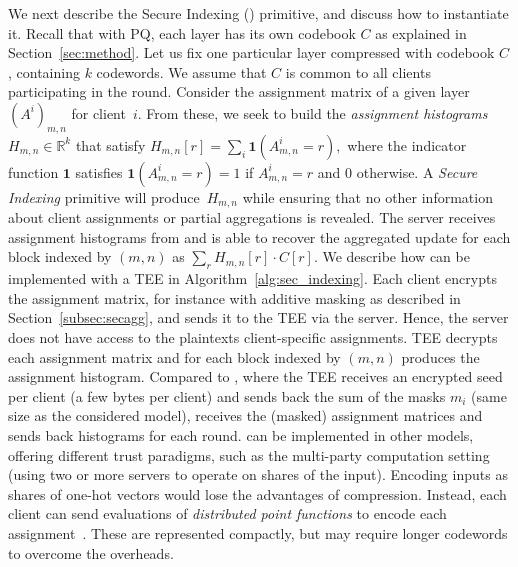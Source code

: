 We next describe the Secure Indexing (\SecInd) primitive, and discuss how to instantiate it. 
Recall that with PQ, each layer has its own codebook $C$ as explained in Section~\ref{sec:method}. 
Let us fix one particular layer compressed with codebook $C$, containing $k$ codewords. 
We assume that $C$ is common to all clients participating in the round. 
Consider the assignment matrix of a given layer $(A^i)_{m,n}$ for client~$i$.
From these, we seek to build the \emph{assignment histograms} $H_{m,n} \in \mathbb R^k$ that satisfy
$H_{m,n}[r] = \sum_i \mathbf 1\left(A^i_{m,n} = r\right),$
where the indicator function $\mathbf 1$ satisfies $\mathbf 1\left(A^i_{m,n} = r\right) = 1$ if $A^i_{m,n} = r$ and $0$ otherwise.
A \emph{Secure Indexing} primitive will produce~$H_{m,n}$ while ensuring that no other information about client assignments or partial aggregations is revealed. 
The server receives assignment histograms from \SecInd and is able to recover the aggregated update for each block indexed by $(m, n)$ as 
$
        \sum_r  H_{m,n}[r] \cdot C[r].
$
%
We describe how \SecInd can be implemented with a TEE in Algorithm~\ref{alg:sec_indexing}.
Each client encrypts the assignment matrix, for instance with additive masking as described in Section~\ref{subsec:secagg}, and sends it to the TEE via the server. 
Hence, the server does not have access to the plaintexts client-specific assignments. 
TEE decrypts each assignment matrix and for each block indexed by $(m, n)$ produces the assignment histogram. 
Compared to \SecAgg, where the TEE receives an encrypted seed per client (a few bytes per client) and sends back the sum of the masks $m_i$ (same size as the considered model), \SecInd receives the (masked) assignment matrices and sends back histograms for each round.
\SecInd can be implemented in other models, offering different trust paradigms,   
such as the multi-party computation setting (using two or more servers to operate on shares of the input).
Encoding inputs as shares of one-hot vectors would lose the advantages of compression. 
Instead, each client can send evaluations of \emph{distributed point functions} to encode each assignment~\citep{boyle16}. 
These are represented compactly, but may require longer codewords to overcome the overheads. 

